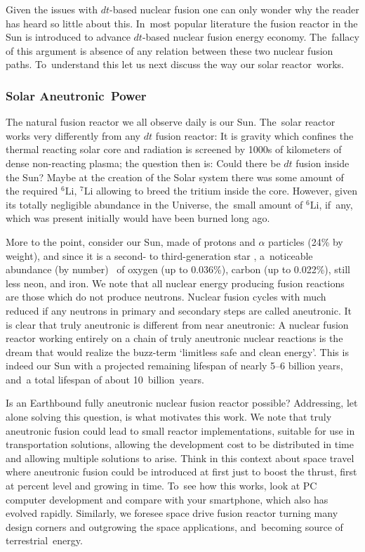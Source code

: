 \documentclass[particles,article,accept,pdftex,moreauthors]{Definitions/mdpi}
\newcommand*{\xblue}{}
\begin{document}
Given the issues with $dt$-based nuclear fusion one can only wonder why the reader has heard so little about this. In~most popular literature the fusion reactor in the Sun is introduced to advance $dt$-based nuclear fusion energy economy. The~fallacy of this argument is absence of any relation between these two nuclear fusion paths. To~understand this let us next discuss the way our solar reactor~works.

 \subsubsection{Solar Aneutronic~Power}\label{sssub:sunN}
The natural fusion reactor we all observe daily is our Sun. The~solar reactor works very differently from any $dt$ fusion reactor: It is gravity which confines the thermal reacting solar core and radiation is screened by 1000s of kilometers of dense non-reacting plasma; the question then is: Could there be $dt$ fusion inside the Sun? Maybe at the creation of the Solar system there was some amount of the required ${}^6\mathrm{Li}$, ${}^7\mathrm{Li}$ allowing to breed the tritium inside the core. However, given its totally negligible abundance in the Universe, the~small amount of ${}^6\mathrm{Li}$, if~any, which was present initially would have been burned long ago. %

More to the point, consider our Sun, made of protons and $\alpha$ particles (24\% by weight), {\xblue and since it is a second- to third-generation star %
	,  a~noticeable abundance (by number)~\cite{Asplund:2021Sun} of oxygen (up to 0.036\%), carbon (up to 0.022\%), still less neon, and iron.  We note that} all nuclear energy producing fusion reactions are those which do not produce neutrons. Nuclear fusion cycles with much reduced if any neutrons in primary and secondary steps are called aneutronic. It is clear that truly aneutronic is different from near aneutronic: A nuclear fusion reactor working entirely on a chain of truly aneutronic nuclear reactions is the dream that would realize the buzz-term `limitless safe and clean energy'. This is indeed our Sun with a projected remaining lifespan of nearly 5--6 billion years, and~a total lifespan of about 10~billion~years.

Is an Earthbound fully aneutronic nuclear fusion reactor possible? Addressing, let alone solving this question, is what motivates this work. We note that truly aneutronic fusion could lead to small reactor implementations, suitable for use in transportation solutions, allowing the development cost to be distributed in time and allowing multiple solutions to arise. Think in this context about space travel where aneutronic fusion could be introduced at first just to boost the thrust, first at percent level and growing in time. To~see how this works, look at PC computer development and compare with your smartphone, which also has evolved rapidly. Similarly, we foresee space drive fusion reactor turning many design corners and outgrowing the space applications, and~becoming source of terrestrial~energy.
\end{document}
